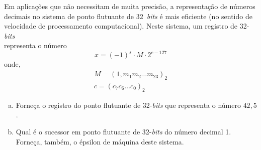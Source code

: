 \begin{exeresol}
  Em aplicações que não necessitam de muita precisão, a representação de números decimais no sistema de ponto flutuante de 32~{\it bits} é mais eficiente (no sentido de velocidade de processamento computacional). Neste sistema, um registro de 32-{\it bits}
  \begin{equation}
    [s ~ | ~ c_7 ~ c_6 ~ \ldots ~ c_0 ~ | ~ m_1 ~ m_2 ~ \ldots ~ m_{23}]
  \end{equation}
  representa o número
  \begin{equation}
    x = (-1)^s\cdot M\cdot 2^{c-127}
  \end{equation}
  onde,
  \begin{gather}
    M = (1,m_1m_2\ldots m_{23})_2\\
    c = (c_7c_6\ldots c_0)_2
  \end{gather}
  \begin{enumerate}[a)]
  \item Forneça o registro do ponto flutuante de 32-{\it bits} que representa o número $42,5$.
  \item Qual é o sucessor em ponto flutuante de 32-{\it bits} do número decimal 1. Forneça, também, o épsilon de máquina deste sistema.
  \end{enumerate}
\end{exeresol}
